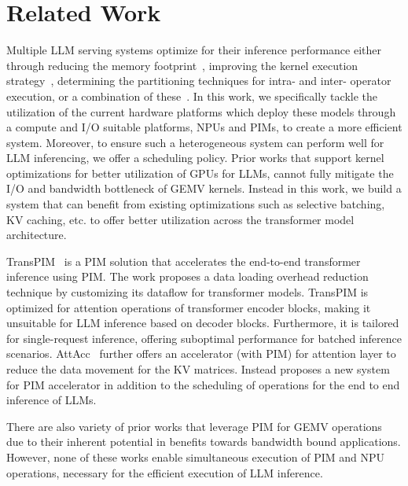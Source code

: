 \section{Related Work}
\label{sec:related}



%
Multiple LLM serving systems optimize for their inference performance either through reducing the memory footprint~\cite{arxiv21-lightseq, kvcaching}, improving the kernel execution strategy~\cite{alpa}, determining the partitioning techniques for intra- and inter- operator~\cite{pip, megatronlm, arxiv22-efficiently} execution, or a combination of these~\cite{deepspeed, orca, vllm, hugging-face, tensorflow-serving, tensorrt-llm, nvidia_triton, miao2023spotserve, li2023alpaserve}.
%
In this work, we specifically tackle the utilization of the current hardware platforms which deploy these models through a compute and I/O suitable platforms, NPUs and PIMs, to create a more efficient system. 
%
Moreover, to ensure such a heterogeneous system can perform well for LLM inferencing, we offer a scheduling policy.
%
Prior works that support kernel optimizations for better utilization of GPUs for LLMs, cannot fully mitigate the I/O and bandwidth bottleneck of GEMV kernels. 
%
Instead in this work, we build a system that can benefit from existing optimizations such as selective batching, KV caching, etc. to offer better utilization across the transformer model architecture.
%

%
TransPIM~\cite{hpca22-transpim} is a PIM solution that accelerates the end-to-end transformer inference using PIM. 
%
The work proposes a data loading overhead reduction technique by customizing its dataflow for transformer models.
%
TransPIM is optimized for attention operations of transformer encoder blocks, making it unsuitable for LLM inference based on decoder blocks.
%
Furthermore, it is tailored for single-request inference, offering suboptimal performance for batched inference scenarios.
%
AttAcc~\cite{AttAcc} further offers an accelerator (with PIM) for attention layer to reduce the data movement for the KV matrices.
%
Instead \neupims proposes a new system for PIM accelerator in addition to the scheduling of operations for the end to end inference of LLMs. 

There are also variety of prior works that leverage PIM for GEMV operations~\cite{hcs23-aquabolt-xl, isscc22-aim-gddr6, micro21-trim, hbm_pim, newton, tensor-dimm, SpaceA} due to their inherent potential in benefits towards bandwidth bound applications.
%
However, none of these works enable simultaneous execution of PIM and NPU operations, necessary for the efficient execution of LLM inference. 

